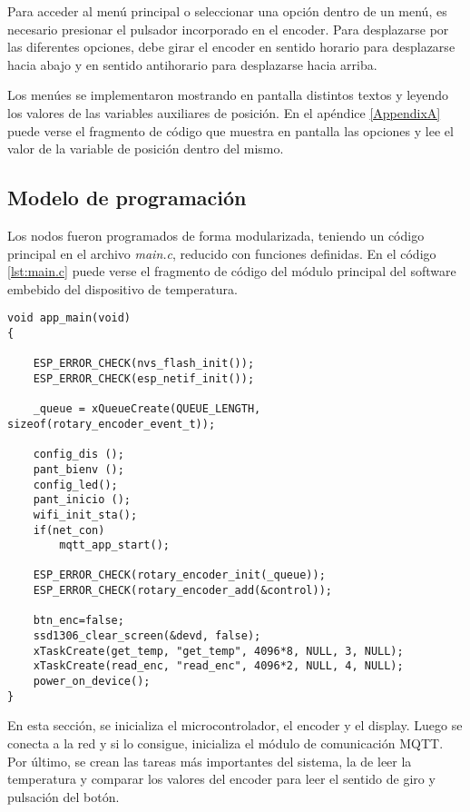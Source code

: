 Para acceder al menú principal o seleccionar una opción dentro de un menú, es necesario presionar el pulsador incorporado en el encoder. Para desplazarse por las diferentes opciones, debe girar el encoder en sentido horario para desplazarse hacia abajo y en sentido antihorario para desplazarse hacia arriba.

Los menúes se implementaron mostrando en pantalla distintos textos y leyendo los valores de las variables auxiliares de posición. En el apéndice \ref{AppendixA} puede verse el fragmento de código que muestra en pantalla las opciones y lee el valor de la variable de posición dentro del mismo.

\subsection{Modelo de programación}

Los nodos fueron programados de forma modularizada, teniendo un código principal en el archivo \textit{main.c}, reducido con funciones definidas. En el código \ref{lst:main.c} puede verse el fragmento de código del módulo principal del software embebido del dispositivo de temperatura.

\begin{lstlisting}[caption={Código de \textit{main.c}.}, label={lst:main.c}]
void app_main(void)
{
    
	ESP_ERROR_CHECK(nvs_flash_init());
	ESP_ERROR_CHECK(esp_netif_init());

	_queue = xQueueCreate(QUEUE_LENGTH, sizeof(rotary_encoder_event_t));

	config_dis ();
	pant_bienv ();
	config_led();
	pant_inicio ();
	wifi_init_sta();
    if(net_con)
		mqtt_app_start();
	
	ESP_ERROR_CHECK(rotary_encoder_init(_queue));
	ESP_ERROR_CHECK(rotary_encoder_add(&control));
	
	btn_enc=false;
	ssd1306_clear_screen(&devd, false);
	xTaskCreate(get_temp, "get_temp", 4096*8, NULL, 3, NULL);
	xTaskCreate(read_enc, "read_enc", 4096*2, NULL, 4, NULL);
	power_on_device();
}
\end{lstlisting}

En esta sección, se inicializa el microcontrolador, el encoder y el display. Luego se conecta a la red y si lo consigue, inicializa el módulo de comunicación MQTT. Por último, se crean las tareas más importantes del sistema, la de leer la temperatura y comparar los valores del encoder para leer el sentido de giro y pulsación del botón.

